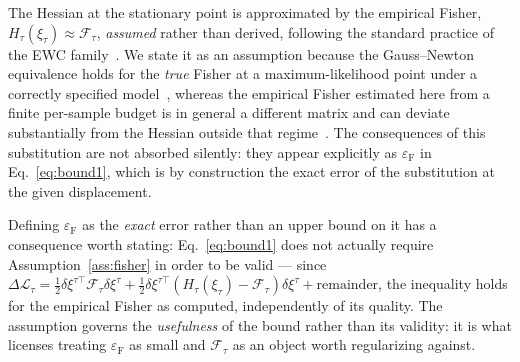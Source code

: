 \begin{assumption}
\label{ass:fisher}
The Hessian at the stationary point is approximated by the empirical Fisher,
$H_\tau(\xi_\tau)\approx\mathcal{F}_\tau$, \emph{assumed} rather than derived, following
the standard practice of the EWC family~\cite{kirkpatrick2017overcoming,zenke2017continual}.
We state it as an assumption because the Gauss--Newton equivalence holds for the
\emph{true} Fisher at a maximum-likelihood point under a correctly specified
model~\cite{martens2015optimizing}, whereas the empirical Fisher estimated here from a
finite per-sample budget is in general a different matrix and can deviate substantially
from the Hessian outside that regime~\cite{kunstner2019limitations}. The consequences of
this substitution are not absorbed silently: they appear explicitly as
$\varepsilon_{\mathrm{F}}$ in Eq.~\eqref{eq:bound1}, which is by construction the exact
error of the substitution at the given displacement.
\end{assumption}

Defining $\varepsilon_{\mathrm{F}}$ as the \emph{exact} error rather than an upper bound on
it has a consequence worth stating: Eq.~\eqref{eq:bound1} does not actually require
Assumption~\ref{ass:fisher} in order to be valid --- since
$\Delta\mathcal{L}_\tau=\frac12\delta\xi^{\tau\top}\mathcal{F}_\tau\delta\xi^{\tau}+\frac12\delta\xi^{\tau\top}
(H_\tau(\xi_\tau)-\mathcal{F}_\tau)\delta\xi^{\tau}+\text{remainder}$, the inequality holds for the
empirical Fisher as computed, independently of its quality. The assumption governs the
\emph{usefulness} of the bound rather than its validity: it is what licenses treating
$\varepsilon_{\mathrm{F}}$ as small and $\mathcal{F}_\tau$ as an object worth regularizing
against.


